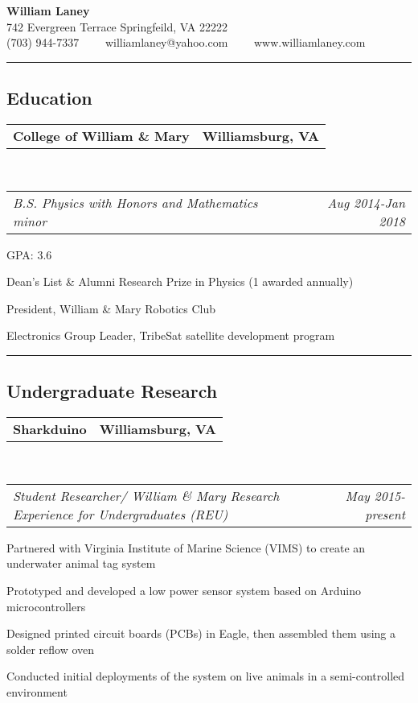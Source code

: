 \documentclass[10pt,letterpaper]{article}
\makeatletter
\newcommand{\headerrow}[2]
{\begin{tabular*}{\linewidth}{l@{\extracolsep{\fill}}r}
	#1 &
	#2 \\
\end{tabular*}}
\makeatother
\begin{document}
\begin{center}
{\LARGE \textbf{William Laney}}\\
\vspace{0.1em}
742 Evergreen Terrace 
Springfeild, VA 22222
\\
(703) 944-7337\ \ \textbullet
\ \ williamlaney@yahoo.com\ \ \textbullet
\ \ www.williamlaney.com
\end{center}

\hrule
\vspace{-0.4em}
\subsection*{Education}

	\headerrow
		{\textbf{College of William \& Mary}}
		{\textbf{Williamsburg, VA}}
	\\
	\headerrow
		{\emph{B.S. Physics with Honors and Mathematics minor}}
		{\emph{Aug 2014-Jan 2018}}
	\begin{itemize*}
		\item GPA: 3.6
		\item Dean's List \& Alumni Research Prize in Physics (1 awarded annually)
		\item President, William \& Mary Robotics Club
		\item Electronics Group Leader, TribeSat satellite development program
	\end{itemize*}

\hrule
\vspace{-0.4em}
\subsection*{Undergraduate Research}

	\headerrow
		{\textbf{Sharkduino}}
		{\textbf{Williamsburg, VA}}
	\\
	\headerrow
		{\emph{Student Researcher/ William \& Mary Research Experience for Undergraduates (REU)}}
		{\emph{May 2015-present}}
	\begin{itemize*}
	\item Partnered with Virginia Institute of Marine Science (VIMS) to create an underwater animal tag system
	\item Prototyped and developed a low power sensor system based on Arduino microcontrollers
	\item Designed printed circuit boards (PCBs) in Eagle, then assembled them using a solder reflow oven
	\item Conducted initial deployments of the system on live animals in a semi-controlled environment
	
	\end{itemize*}
	
\end{document}
